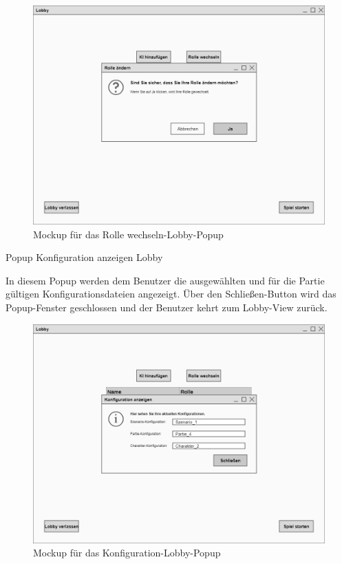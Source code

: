 \begin{figure}
  \centering
  \includegraphics[width=\textwidth]{Meilenstein03/RolleWechseln-Lobby_Mockup.png}
  \caption{Mockup für das Rolle wechseln-Lobby-Popup}
\end{figure}

Popup \glqq{}Konfiguration anzeigen Lobby\grqq{}

In diesem Popup werden dem Benutzer die ausgewählten und für die Partie gültigen Konfigurationsdateien angezeigt. Über den Schließen-Button wird das Popup-Fenster geschlossen und der Benutzer kehrt zum Lobby-View zurück.

\begin{figure}
  \centering
  \includegraphics[width=\textwidth]{Meilenstein03/Konfiguration-Lobby_Mockup.png}
  \caption{Mockup für das Konfiguration-Lobby-Popup}
\end{figure}

